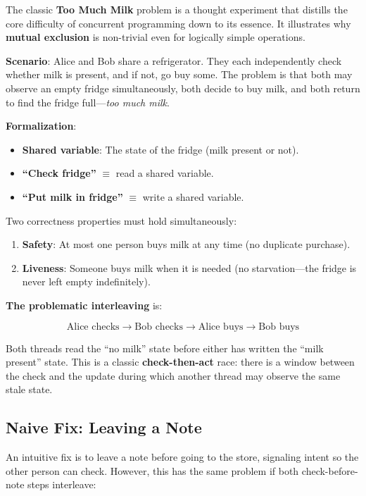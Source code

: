 \documentclass[11pt]{article}
\begin{document}
The classic \textbf{Too Much Milk} problem is a thought experiment that distills the core difficulty of concurrent programming down to its essence. It illustrates why \textbf{mutual exclusion} is non-trivial even for logically simple operations.

\textbf{Scenario}: Alice and Bob share a refrigerator. They each independently check whether milk is present, and if not, go buy some. The problem is that both may observe an empty fridge simultaneously, both decide to buy milk, and both return to find the fridge full---\emph{too much milk}.

\textbf{Formalization}:
\begin{itemize}
    \item \textbf{Shared variable}: The state of the fridge (milk present or not).
    \item \textbf{``Check fridge''} $\equiv$ read a shared variable.
    \item \textbf{``Put milk in fridge''} $\equiv$ write a shared variable.
\end{itemize}

Two correctness properties must hold simultaneously:
\begin{enumerate}
    \item \textbf{Safety}: At most one person buys milk at any time (no duplicate purchase).
    \item \textbf{Liveness}: Someone buys milk when it is needed (no starvation---the fridge is never left empty indefinitely).
\end{enumerate}

\textbf{The problematic interleaving} is:

\[
\text{Alice checks} \to \text{Bob checks} \to \text{Alice buys} \to \text{Bob buys}
\]

Both threads read the ``no milk'' state before either has written the ``milk present'' state. This is a classic \textbf{check-then-act} race: there is a window between the check and the update during which another thread may observe the same stale state.

\subsection{Naive Fix: Leaving a Note}

An intuitive fix is to leave a note before going to the store, signaling intent so the other person can check. However, this has the same problem if both check-before-note steps interleave:
\end{document}
